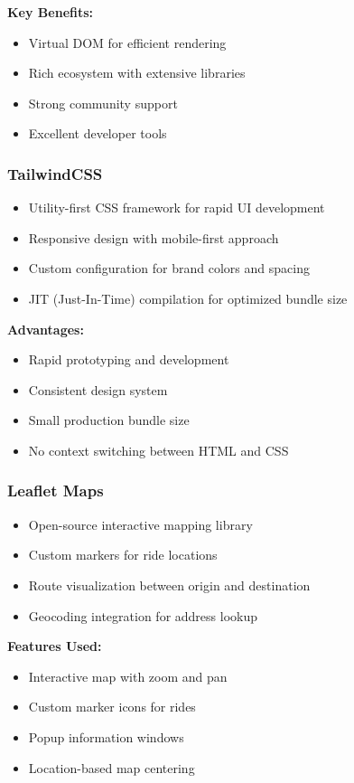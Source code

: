 \documentclass[12pt,a4paper]{article}
\begin{document}
\textbf{Key Benefits:}
\begin{itemize}
    \item Virtual DOM for efficient rendering
    \item Rich ecosystem with extensive libraries
    \item Strong community support
    \item Excellent developer tools
\end{itemize}

\subsubsection{TailwindCSS}
\begin{itemize}
    \item Utility-first CSS framework for rapid UI development
    \item Responsive design with mobile-first approach
    \item Custom configuration for brand colors and spacing
    \item JIT (Just-In-Time) compilation for optimized bundle size
\end{itemize}

\textbf{Advantages:}
\begin{itemize}
    \item Rapid prototyping and development
    \item Consistent design system
    \item Small production bundle size
    \item No context switching between HTML and CSS
\end{itemize}

\subsubsection{Leaflet Maps}
\begin{itemize}
    \item Open-source interactive mapping library
    \item Custom markers for ride locations
    \item Route visualization between origin and destination
    \item Geocoding integration for address lookup
\end{itemize}

\textbf{Features Used:}
\begin{itemize}
    \item Interactive map with zoom and pan
    \item Custom marker icons for rides
    \item Popup information windows
    \item Location-based map centering
\end{itemize}
\end{document}
